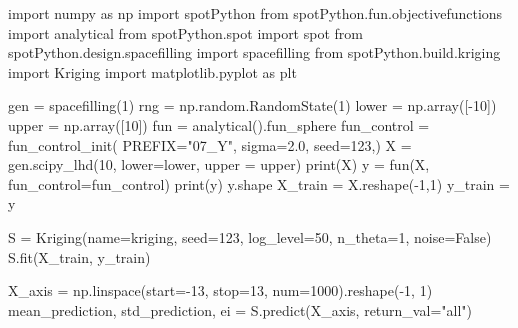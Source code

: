 \documentclass[
  letterpaper,
  DIV=11,
  numbers=noendperiod]{scrreprt}
\newenvironment{Shaded}{\begin{snugshade}}{\end{snugshade}}
\newcommand{\BuiltInTok}[1]{\textcolor[rgb]{0.00,0.23,0.31}{#1}}
\newcommand{\DecValTok}[1]{\textcolor[rgb]{0.68,0.00,0.00}{#1}}
\newcommand{\FloatTok}[1]{\textcolor[rgb]{0.68,0.00,0.00}{#1}}
\newcommand{\ImportTok}[1]{\textcolor[rgb]{0.00,0.46,0.62}{#1}}
\newcommand{\NormalTok}[1]{\textcolor[rgb]{0.00,0.23,0.31}{#1}}
\newcommand{\OperatorTok}[1]{\textcolor[rgb]{0.37,0.37,0.37}{#1}}
\newcommand{\StringTok}[1]{\textcolor[rgb]{0.13,0.47,0.30}{#1}}
\newcommand{\VariableTok}[1]{\textcolor[rgb]{0.07,0.07,0.07}{#1}}
\begin{document}
\begin{Shaded}
\begin{Highlighting}[]
\ImportTok{import}\NormalTok{ numpy }\ImportTok{as}\NormalTok{ np}
\ImportTok{import}\NormalTok{ spotPython}
\ImportTok{from}\NormalTok{ spotPython.fun.objectivefunctions }\ImportTok{import}\NormalTok{ analytical}
\ImportTok{from}\NormalTok{ spotPython.spot }\ImportTok{import}\NormalTok{ spot}
\ImportTok{from}\NormalTok{ spotPython.design.spacefilling }\ImportTok{import}\NormalTok{ spacefilling}
\ImportTok{from}\NormalTok{ spotPython.build.kriging }\ImportTok{import}\NormalTok{ Kriging}
\ImportTok{import}\NormalTok{ matplotlib.pyplot }\ImportTok{as}\NormalTok{ plt}

\NormalTok{gen }\OperatorTok{=}\NormalTok{ spacefilling(}\DecValTok{1}\NormalTok{)}
\NormalTok{rng }\OperatorTok{=}\NormalTok{ np.random.RandomState(}\DecValTok{1}\NormalTok{)}
\NormalTok{lower }\OperatorTok{=}\NormalTok{ np.array([}\OperatorTok{{-}}\DecValTok{10}\NormalTok{])}
\NormalTok{upper }\OperatorTok{=}\NormalTok{ np.array([}\DecValTok{10}\NormalTok{])}
\NormalTok{fun }\OperatorTok{=}\NormalTok{ analytical().fun\_sphere}
\NormalTok{fun\_control }\OperatorTok{=}\NormalTok{ fun\_control\_init(}
\NormalTok{    PREFIX}\OperatorTok{=}\StringTok{"07\_Y"}\NormalTok{,}
\NormalTok{    sigma}\OperatorTok{=}\FloatTok{2.0}\NormalTok{,}
\NormalTok{    seed}\OperatorTok{=}\DecValTok{123}\NormalTok{,)}
\NormalTok{X }\OperatorTok{=}\NormalTok{ gen.scipy\_lhd(}\DecValTok{10}\NormalTok{, lower}\OperatorTok{=}\NormalTok{lower, upper }\OperatorTok{=}\NormalTok{ upper)}
\BuiltInTok{print}\NormalTok{(X)}
\NormalTok{y }\OperatorTok{=}\NormalTok{ fun(X, fun\_control}\OperatorTok{=}\NormalTok{fun\_control)}
\BuiltInTok{print}\NormalTok{(y)}
\NormalTok{y.shape}
\NormalTok{X\_train }\OperatorTok{=}\NormalTok{ X.reshape(}\OperatorTok{{-}}\DecValTok{1}\NormalTok{,}\DecValTok{1}\NormalTok{)}
\NormalTok{y\_train }\OperatorTok{=}\NormalTok{ y}

\NormalTok{S }\OperatorTok{=}\NormalTok{ Kriging(name}\OperatorTok{=}\StringTok{\textquotesingle{}kriging\textquotesingle{}}\NormalTok{,}
\NormalTok{            seed}\OperatorTok{=}\DecValTok{123}\NormalTok{,}
\NormalTok{            log\_level}\OperatorTok{=}\DecValTok{50}\NormalTok{,}
\NormalTok{            n\_theta}\OperatorTok{=}\DecValTok{1}\NormalTok{,}
\NormalTok{            noise}\OperatorTok{=}\VariableTok{False}\NormalTok{)}
\NormalTok{S.fit(X\_train, y\_train)}

\NormalTok{X\_axis }\OperatorTok{=}\NormalTok{ np.linspace(start}\OperatorTok{={-}}\DecValTok{13}\NormalTok{, stop}\OperatorTok{=}\DecValTok{13}\NormalTok{, num}\OperatorTok{=}\DecValTok{1000}\NormalTok{).reshape(}\OperatorTok{{-}}\DecValTok{1}\NormalTok{, }\DecValTok{1}\NormalTok{)}
\NormalTok{mean\_prediction, std\_prediction, ei }\OperatorTok{=}\NormalTok{ S.predict(X\_axis, return\_val}\OperatorTok{=}\StringTok{"all"}\NormalTok{)}


\end{Highlighting}
\end{Shaded}
\end{document}
